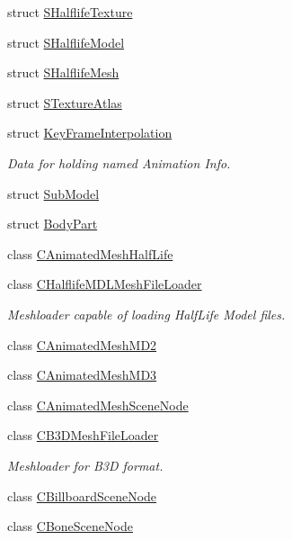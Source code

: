 \begin{DoxyCompactItemize}
\item 
struct \hyperlink{structirr_1_1scene_1_1_s_halflife_texture}{S\-Halflife\-Texture}
\item 
struct \hyperlink{structirr_1_1scene_1_1_s_halflife_model}{S\-Halflife\-Model}
\item 
struct \hyperlink{structirr_1_1scene_1_1_s_halflife_mesh}{S\-Halflife\-Mesh}
\item 
struct \hyperlink{structirr_1_1scene_1_1_s_texture_atlas}{S\-Texture\-Atlas}
\item 
struct \hyperlink{structirr_1_1scene_1_1_key_frame_interpolation}{Key\-Frame\-Interpolation}
\begin{DoxyCompactList}\small\item\em Data for holding named Animation Info. \end{DoxyCompactList}\item 
struct \hyperlink{structirr_1_1scene_1_1_sub_model}{Sub\-Model}
\item 
struct \hyperlink{structirr_1_1scene_1_1_body_part}{Body\-Part}
\item 
class \hyperlink{classirr_1_1scene_1_1_c_animated_mesh_half_life}{C\-Animated\-Mesh\-Half\-Life}
\item 
class \hyperlink{classirr_1_1scene_1_1_c_halflife_m_d_l_mesh_file_loader}{C\-Halflife\-M\-D\-L\-Mesh\-File\-Loader}
\begin{DoxyCompactList}\small\item\em Meshloader capable of loading Half\-Life Model files. \end{DoxyCompactList}\item 
class \hyperlink{classirr_1_1scene_1_1_c_animated_mesh_m_d2}{C\-Animated\-Mesh\-M\-D2}
\item 
class \hyperlink{classirr_1_1scene_1_1_c_animated_mesh_m_d3}{C\-Animated\-Mesh\-M\-D3}
\item 
class \hyperlink{classirr_1_1scene_1_1_c_animated_mesh_scene_node}{C\-Animated\-Mesh\-Scene\-Node}
\item 
class \hyperlink{classirr_1_1scene_1_1_c_b3_d_mesh_file_loader}{C\-B3\-D\-Mesh\-File\-Loader}
\begin{DoxyCompactList}\small\item\em Meshloader for B3\-D format. \end{DoxyCompactList}\item 
class \hyperlink{classirr_1_1scene_1_1_c_billboard_scene_node}{C\-Billboard\-Scene\-Node}
\item 
class \hyperlink{classirr_1_1scene_1_1_c_bone_scene_node}{C\-Bone\-Scene\-Node}

\end{DoxyCompactItemize}
